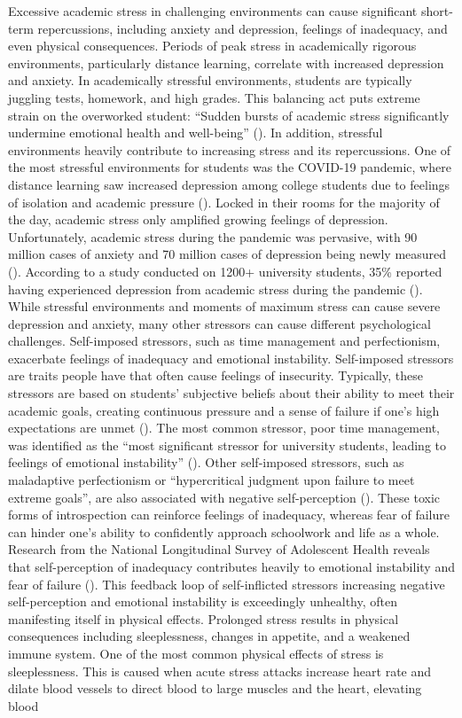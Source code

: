 \documentclass[12pt, a4paper, twoside]{article}
\begin{document}
Excessive academic stress in challenging environments can cause significant short-term repercussions, including anxiety and depression, feelings of inadequacy, and even physical consequences. Periods of peak stress in academically rigorous environments, particularly distance learning, correlate with increased depression and anxiety. In academically stressful environments, students are typically juggling tests, homework, and high grades. This balancing act puts extreme strain on the overworked student: “Sudden bursts of academic stress significantly undermine emotional health and well-being” (\cite{claney2023}). In addition, stressful environments heavily contribute to increasing stress and its repercussions. One of the most stressful environments for students was the COVID-19 pandemic, where distance learning saw increased depression among college students due to feelings of isolation and academic pressure (\cite{chen2024}). Locked in their rooms for the majority of the day, academic stress only amplified growing feelings of depression. Unfortunately, academic stress during the pandemic was pervasive, with 90 million cases of anxiety and 70 million cases of depression being newly measured (\cite{cordovaolivera2023}). According to a study conducted on 1200+ university students, 35\% reported having experienced depression from academic stress during the pandemic (\cite{cordovaolivera2023}). While stressful environments and moments of maximum stress can cause severe depression and anxiety, many other stressors can cause different psychological challenges. Self-imposed stressors, such as time management and perfectionism, exacerbate feelings of inadequacy and emotional instability. Self-imposed stressors are traits people have that often cause feelings of insecurity. Typically, these stressors are based on students' subjective beliefs about their ability to meet their academic goals, creating continuous pressure and a sense of failure if one’s high expectations are unmet (\cite{cordovaolivera2023}). The most common stressor, poor time management, was identified as the “most significant stressor for university students, leading to feelings of emotional instability” (\cite{cordovaolivera2023}). Other self-imposed stressors, such as maladaptive perfectionism or “hypercritical judgment upon failure to meet extreme goals”, are also associated with negative self-perception (\cite{almroth2019}). These toxic forms of introspection can reinforce feelings of inadequacy, whereas fear of failure can hinder one’s ability to confidently approach schoolwork and life as a whole. Research from the National Longitudinal Survey of Adolescent Health reveals that self-perception of inadequacy contributes heavily to emotional instability and fear of failure (\cite{mcleod2012}). This feedback loop of self-inflicted stressors increasing negative self-perception and emotional instability is exceedingly unhealthy, often manifesting itself in physical effects. Prolonged stress results in physical consequences including sleeplessness, changes in appetite, and a weakened immune system. One of the most common physical effects of stress is sleeplessness. This is caused when acute stress attacks increase heart rate and dilate blood vessels to direct blood to large muscles and the heart, elevating blood 
\end{document}
